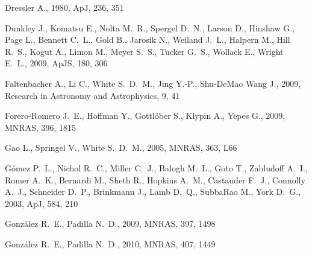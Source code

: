\documentclass[useAMS,usenatbib]{mn2e}
\newcommand{\apj}{ApJ}
\newcommand{\apjs}{ApJS}
\newcommand{\mnras}{MNRAS}
\begin{document}
\begin{thebibliography}{}
{Dressler} A.,  1980, \apj, 236, 351

{Dunkley} J.,  {Komatsu} E.,  {Nolta} M.~R.,  {Spergel} D.~N.,  {Larson} D.,
  {Hinshaw} G.,  {Page} L.,  {Bennett} C.~L.,  {Gold} B.,  {Jarosik} N.,
  {Weiland} J.~L.,  {Halpern} M.,  {Hill} R.~S.,  {Kogut} A.,  {Limon} M.,
  {Meyer} S.~S.,  {Tucker} G.~S.,  {Wollack} E.,    {Wright} E.~L.,  2009,
  \apjs, 180, 306

{Faltenbacher} A.,  {Li} C.,  {White} S.~D.~M.,  {Jing} Y.-P.,  {Shu-DeMao}
  {Wang} J.,  2009, Research in Astronomy and Astrophysics, 9, 41

{Forero-Romero} J.~E.,  {Hoffman} Y.,  {Gottl{\"o}ber} S.,  {Klypin} A.,
  {Yepes} G.,  2009, \mnras, 396, 1815

{Gao} L.,  {Springel} V.,    {White} S.~D.~M.,  2005, \mnras, 363, L66

{G{\'o}mez} P.~L.,  {Nichol} R.~C.,  {Miller} C.~J.,  {Balogh} M.~L.,  {Goto}
  T.,  {Zabludoff} A.~I.,  {Romer} A.~K.,  {Bernardi} M.,  {Sheth} R.,
  {Hopkins} A.~M.,  {Castander} F.~J.,  {Connolly} A.~J.,  {Schneider} D.~P.,
  {Brinkmann} J.,  {Lamb} D.~Q.,  {SubbaRao} M.,    {York} D.~G.,  2003, \apj,
  584, 210

{Gonz{\'a}lez} R.~E.,  {Padilla} N.~D.,  2009, \mnras, 397, 1498

{Gonz{\'a}lez} R.~E.,  {Padilla} N.~D.,  2010, \mnras, 407, 1449


\end{thebibliography}
\end{document}
